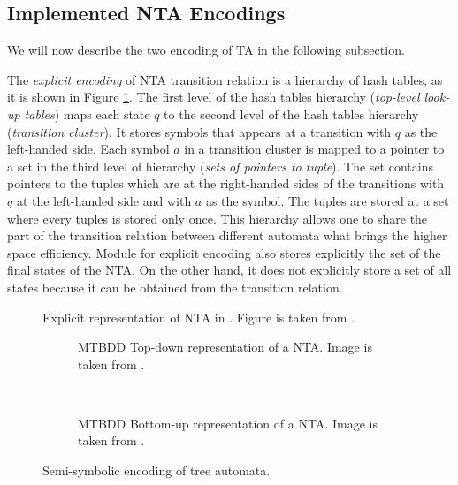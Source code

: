 \subsection{Implemented NTA Encodings}

We will now describe the two encoding of TA in the following subsection.

The \emph{explicit encoding} of NTA transition relation is a hierarchy
of hash tables, as it is shown in Figure \ref{fig:explnta}.
The first level of the hash tables hierarchy (\emph{top-level look-up tables}) maps each state $q$ to 
the second level of the hash tables hierarchy (\emph{transition cluster}).
It stores symbols that appears at a transition with $q$ as the left-handed side.
Each symbol $a$ in a transition cluster is mapped to a pointer to a set in the third level of hierarchy (\emph{sets of pointers to tuple}).
The set contains pointers to the tuples which are at the right-handed sides of
the transitions with $q$ at the left-handed side and with $a$ as the symbol.
The tuples are stored at a set where every tuples is stored only once.
This hierarchy allows one to share the part of the transition
relation between different automata
what brings the higher space efficiency.
Module for explicit encoding also stores explicitly the set of the final states of the NTA.
On the other hand, it does not explicitly store a set of all states because it can be obtained from the transition relation.

\begin{figure}[bt]
\begin{center}

	\caption{Explicit representation of NTA in \vata. Figure is taken from \cite{libvata}.}
	\label{fig:explnta}
\end{center}
\end{figure}

\begingroup
{}%
\begin{figure}[bt]
	\centering
	\begin{subfigure}{.5\textwidth}
		\centering
		
		\caption{MTBDD Top-down representation of a NTA. Image is taken from \cite{libvata}.}
		\label{fig:mtbdd_td}
	\end{subfigure}%
	~
	\begin{subfigure}{.5\textwidth}
	\centering
	
	\caption{MTBDD Bottom-up representation of a NTA. Image is taken from \cite{libvata}.}
	\label{fig:mtbdd_bu}
	\end{subfigure}%
\caption{Semi-symbolic encoding of tree automata.}
\label{fig:symnta}
\end{figure}
\endgroup


